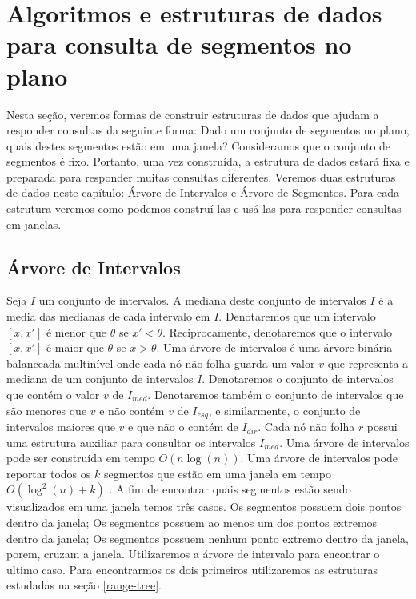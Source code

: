 \chapter{Algoritmos e estruturas de dados para consulta de segmentos no plano}
Nesta seção, veremos formas de construir estruturas de dados que ajudam a responder consultas da seguinte forma: Dado um conjunto de segmentos no plano, quais destes segmentos estão em uma janela? Consideramos que o conjunto de segmentos é fixo. Portanto, uma vez construída, a estrutura de dados estará fixa e preparada para responder muitas consultas diferentes. Veremos duas estruturas de dados neste capítulo: Árvore de Intervalos e Árvore de Segmentos. Para cada estrutura veremos como podemos construí-las e usá-las para responder consultas em janelas.%

\section{Árvore de Intervalos} \label{interval-tree}
Seja $I$ um conjunto de intervalos. A mediana deste conjunto de intervalos $I$ é a media das medianas de cada intervalo em $I$. Denotaremos que um intervalo $[x, x']$ é menor que $\theta$ se $x' < \theta$. Reciprocamente, denotaremos que o intervalo $[x, x']$ é maior que $\theta$ se $x > \theta$.
Uma árvore de intervalos é uma árvore binária balanceada multinível onde cada nó não folha guarda um valor $v$ que representa a mediana de um conjunto de intervalos $I$. Denotaremos o conjunto de intervalos que contém o valor $v$ de $I_{med}$. Denotaremos também o conjunto de intervalos que são menores que $v$ e não contém $v$ de $I_{esq}$, e similarmente, o conjunto de intervalos maiores que $v$ e que não o contém de $I_{dir}$. Cada nó não folha $r$ possui uma estrutura auxiliar para consultar os intervalos $I_{med}$. Uma árvore de intervalos pode ser construída em tempo $O(n\log(n))$. Uma árvore de intervalos pode reportar todos os $k$ segmentos que estão em uma janela em tempo $O(\log^2(n) + k)$ \cite{cg08}. %
A fim de encontrar quais segmentos estão sendo visualizados em uma janela temos três casos. Os segmentos possuem dois pontos dentro da janela; Os segmentos possuem ao menos um dos pontos extremos dentro da janela; Os segmentos possuem nenhum ponto extremo dentro da janela, porem, cruzam a janela. Utilizaremos a árvore de intervalo para encontrar o ultimo caso. Para encontrarmos os dois primeiros utilizaremos as estruturas estudadas na seção \ref{range-tree}.
 
